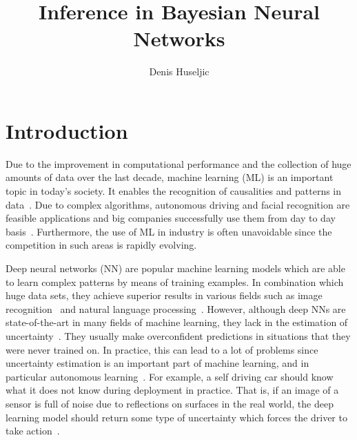 \documentclass[runningheads]{llncs}
\title{Inference in Bayesian Neural Networks}
\begin{document}
\author{Denis Huseljic} 

\maketitle
\begin{abstract}
\blindtext
\end{abstract}


\section{Introduction}
Due to the improvement in computational performance and the collection of huge amounts of data over the last decade, machine learning (ML) is an important topic in today's society.
It enables the recognition of causalities and patterns in data~\cite{bishop:2006:PRML}.
Due to complex algorithms, autonomous driving and facial recognition are feasible applications and big companies successfully use them from day to day basis~\cite{krizhevsky2012imagenet}.
Furthermore, the use of ML in industry is often unavoidable since the competition in such areas is rapidly evolving.

Deep neural networks (NN) are popular machine learning models which are able to learn complex patterns by means of training examples.
In combination which huge data sets, they achieve superior results in various fields such as image recognition~\cite{efficient_net,multigrain} and natural language processing~\cite{nlp1,nlp2}.
However, although deep NNs are state-of-the-art in many fields of machine learning, they lack in the estimation of uncertainty~\cite{Gal2015Bayesian,Kendall2017Uncertainy}.
They usually make overconfident predictions in situations that they were never trained on.
In practice, this can lead to a lot of problems since uncertainty estimation is an important part of machine learning, and in particular autonomous learning~\cite{Gal2016Active}.
For example, a self driving car should know what it does not know during deployment in practice.
That is, if an image of a sensor is full of noise due to reflections on surfaces in the real world, the deep learning model should return some type of uncertainty which forces the driver to take action~\cite{car_accident}.
\end{document}
